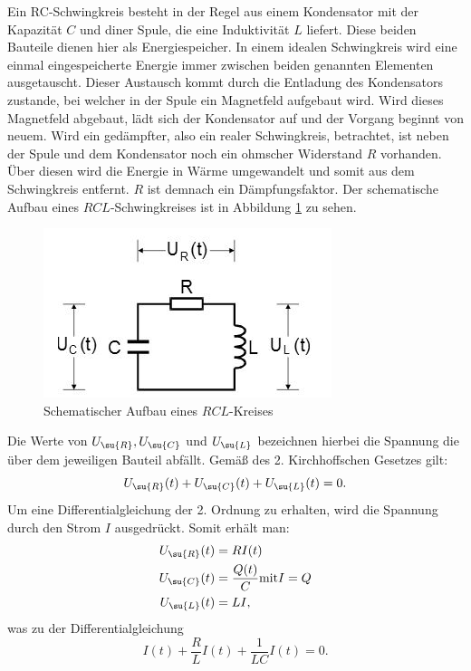 Ein RC-Schwingkreis besteht in der Regel aus einem Kondensator mit der
Kapazität $C$ und diner Spule, die eine Induktivität $L$ liefert.
Diese beiden Bauteile dienen hier als Energiespeicher.
In einem idealen Schwingkreis wird eine einmal eingespeicherte Energie
immer zwischen beiden genannten Elementen ausgetauscht.
Dieser Austausch kommt durch die Entladung des Kondensators zustande, bei welcher
in der Spule ein Magnetfeld aufgebaut wird. Wird dieses Magnetfeld abgebaut,
lädt sich der Kondensator auf und der Vorgang beginnt von neuem.
Wird ein gedämpfter, also ein realer Schwingkreis, betrachtet, ist neben der
Spule und dem Kondensator noch ein ohmscher Widerstand $R$ vorhanden.
Über diesen wird die Energie in Wärme umgewandelt und somit aus dem
Schwingkreis entfernt. $R$ ist demnach ein Dämpfungsfaktor.
Der schematische Aufbau eines $RCL$-Schwingkreises ist in Abbildung \ref{fig:rcl}
zu sehen.
\begin{figure}[H]
  \centering
  \includegraphics{Bilder/RCL.JPG}
  \caption{Schematischer Aufbau eines $RCL$-Kreises\cite{354}}
  \label{fig:rcl}
\end{figure}
Die Werte von $U_\su{R}, U_\su{C}$ und $U_\su{L}$ bezeichnen hierbei die Spannung
die über dem jeweiligen Bauteil abfällt. Gemäß des 2. Kirchhoffschen Gesetzes
gilt:
\begin{equation}
  U_\su{R}(t) + U_\su{C}(t) + U_\su{L}(t) = 0.
  \label{eqn:kirch}
\end{equation}
Um eine Differentialgleichung der 2. Ordnung zu erhalten, wird die Spannung
durch den Strom $I$ ausgedrückt. Somit erhält man:
\begin{align*}
  U_\su{R}(t) &= RI(t) \\
  U_\su{C}(t) &= \frac{Q(t)}{C} \text{mit} I = Q \\
  U_\su{L}(t) &= LI ,
\end{align*}
was zu der Differentialgleichung
\begin{equation}
  I(t) + \frac{R}{L}I(t) + \frac{1}{LC}I(t) = 0 .
\end{equation}

